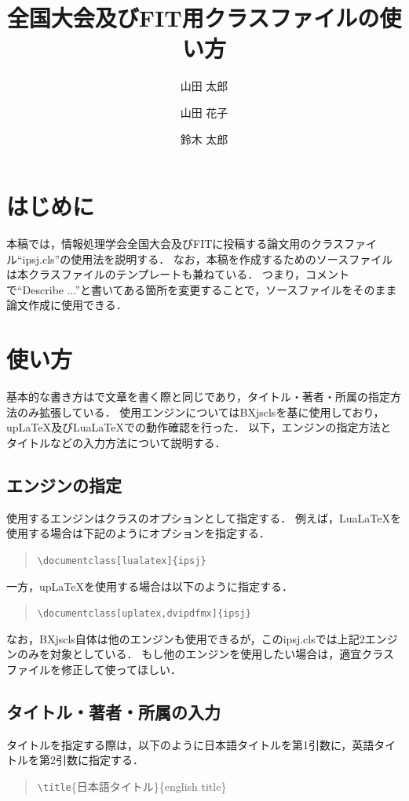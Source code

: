 \documentclass[lualatex]{ipsj}
\title
  {全国大会及びFIT用クラスファイルの使い方}
  {How to use the class file for the national convention of IPSJ and FIT}
\author{山田 太郎}{Tarou Yamada}{IE}
\author{山田 花子}{Hanako Yamada}{I}
\author{鈴木 太郎}{Tarou Suzuki}{I,IS}
\affiliation{IE}
  {名古屋大学工学部電気電子・情報工学科}
  {Department of Information Engineering, School of Engineering, Nagoya University}
\affiliation{I}
  {名古屋大学大学院情報学研究科}
  {Graduate School of Informatics, Nagoya University}
\affiliation{IS}
  {名古屋大学大学院情報科学研究科}
  {Graduate School of Information Science, Nagoya University}
\begin{document}
\maketitle

\section{はじめに}
本稿では，情報処理学会全国大会及びFITに投稿する論文用のクラスファイル``ipsj.cls''の使用法を説明する．
なお，本稿を作成するためのソースファイルは本クラスファイルのテンプレートも兼ねている．
つまり，コメントで``Describe ...''と書いてある箇所を変更することで，ソースファイルをそのまま論文作成に使用できる．


\section{使い方}
基本的な書き方は{\LaTeXe}で文章を書く際と同じであり，タイトル・著者・所属の指定方法のみ拡張している．
使用エンジンについてはBXjsclsを基に使用しており，upLaTeX及びLuaLaTeXでの動作確認を行った．
以下，エンジンの指定方法とタイトルなどの入力方法について説明する．

  \subsection{エンジンの指定}
  使用するエンジンはクラスのオプションとして指定する．
  例えば，LuaLaTeXを使用する場合は下記のようにオプションを指定する．
  \begin{quote}
    \texttt{\textbackslash documentclass[lualatex]\{ipsj\}}
  \end{quote}
  一方，upLaTeXを使用する場合は以下のように指定する．
  \begin{quote}
    \texttt{\textbackslash documentclass[uplatex,dvipdfmx]\{ipsj\}}
  \end{quote}

  なお，BXjscls自体は他のエンジンも使用できるが，このipsj.clsでは上記2エンジンのみを対象としている．
  もし他のエンジンを使用したい場合は，適宜クラスファイルを修正して使ってほしい．

  \subsection{タイトル・著者・所属の入力}
  タイトルを指定する際は，以下のように日本語タイトルを第1引数に，英語タイトルを第2引数に指定する．
    \begin{quote}
    \texttt{\textbackslash title}\{日本語タイトル\}\{english title\}
    \end{quote}
\end{document}
